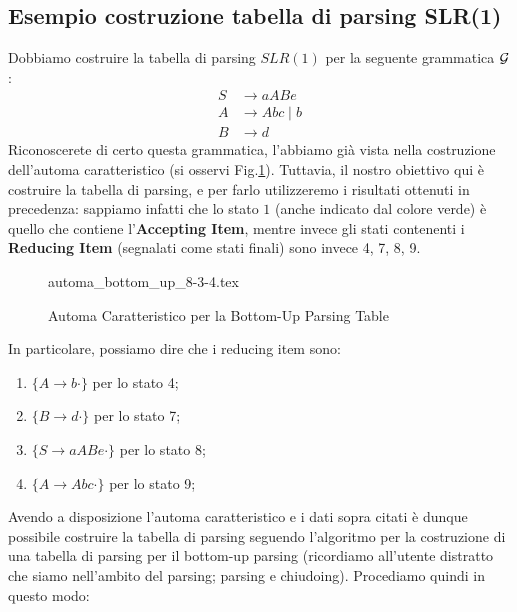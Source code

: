 \documentclass[class=book, crop=false, oneside, 12pt]{standalone}
\begin{document}
\subsection{Esempio costruzione tabella di parsing SLR(1)}
Dobbiamo costruire la tabella di parsing \(SLR(1)\) per la seguente grammatica \(\mathcal{G}\):
\begin{align*}
    S &\rightarrow aABe \\
    A &\rightarrow Abc \mid b \\
    B &\rightarrow d
\end{align*}
Riconoscerete di certo questa grammatica, l'abbiamo già vista nella costruzione dell'automa caratteristico (si osservi Fig.\ref{fig:charateristic-automata-complete}). Tuttavia, il nostro obiettivo qui è costruire la tabella di parsing, e per farlo utilizzeremo i risultati ottenuti in precedenza: sappiamo infatti che lo stato \(1\) (anche indicato dal colore verde) è quello che contiene l'\textbf{Accepting Item}, mentre invece gli stati contenenti i \textbf{Reducing Item} (segnalati come stati finali) sono invece 4, 7, 8, 9. 
\begin{figure}[H]
    \centering
	{automa_bottom_up_8-3-4.tex}
    \caption{Automa Caratteristico per la Bottom-Up Parsing Table}
    \label{fig:charateristic-automata-complete}    
\end{figure}
In particolare, possiamo dire che i reducing item sono:
\begin{enumerate}
    \item \(\{A \rightarrow b \cdot\}\) per lo stato 4;
    \item \(\{B \rightarrow d \cdot\}\) per lo stato 7;
    \item \(\{S \rightarrow aABe \cdot\}\) per lo stato 8;
    \item \(\{A \rightarrow Abc \cdot\}\) per lo stato 9;
\end{enumerate}
Avendo a disposizione l'automa caratteristico e i dati sopra citati è dunque possibile costruire la tabella di parsing seguendo l'algoritmo per la costruzione di una tabella di parsing per il bottom-up parsing (ricordiamo all'utente distratto che siamo nell'ambito del parsing; parsing e chiudoing). Procediamo quindi in questo modo:
\end{document}
